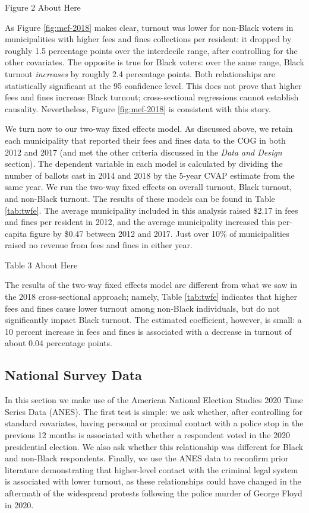 \documentclass[
  12pt,
]{article}
\begin{document}
Figure 2 About Here

As Figure \ref{fig:mef-2018} makes clear, turnout was lower for non-Black voters in municipalities with higher fees and fines collections per resident: it dropped by roughly 1.5 percentage points over the interdecile range, after controlling for the other covariates. The opposite is true for Black voters: over the same range, Black turnout \emph{increases} by roughly 2.4 percentage points. Both relationships are statistically significant at the 95 confidence level. This does not prove that higher fees and fines increase Black turnout; cross-sectional regressions cannot establish causality. Nevertheless, Figure \ref{fig:mef-2018} is consistent with this story.

We turn now to our two-way fixed effects model. As discussed above, we retain each municipality that reported their fees and fines data to the COG in both 2012 and 2017 (and met the other criteria discussed in the \emph{Data and Design} section). The dependent variable in each model is calculated by dividing the number of ballots cast in 2014 and 2018 by the 5-year CVAP estimate from the same year. We run the two-way fixed effects on overall turnout, Black turnout, and non-Black turnout. The results of these models can be found in Table \ref{tab:twfe}. The average municipality included in this analysis raised \$2.17 in fees and fines per resident in 2012, and the average municipality increased this per-capita figure by \$0.47 between 2012 and 2017. Just over 10\% of municipalities raised no revenue from fees and fines in either year.

Table 3 About Here

The results of the two-way fixed effects model are different from what we saw in the 2018 cross-sectional approach; namely, Table \ref{tab:twfe} indicates that higher fees and fines cause lower turnout among non-Black individuals, but do not significantly impact Black turnout. The estimated coefficient, however, is small: a 10 percent increase in fees and fines is associated with a decrease in turnout of about 0.04 percentage points.

\hypertarget{national-survey-data-1}{%
\subsection*{National Survey Data}\label{national-survey-data-1}}

In this section we make use of the American National Election Studies 2020 Time Series Data (ANES). The first test is simple: we ask whether, after controlling for standard covariates, having personal or proximal contact with a police stop in the previous 12 months is associated with whether a respondent voted in the 2020 presidential election. We also ask whether this relationship was different for Black and non-Black respondents. Finally, we use the ANES data to reconfirm prior literature demonstrating that higher-level contact with the criminal legal system is associated with lower turnout, as these relationships could have changed in the aftermath of the widespread protests following the police murder of George Floyd in 2020.
\end{document}
